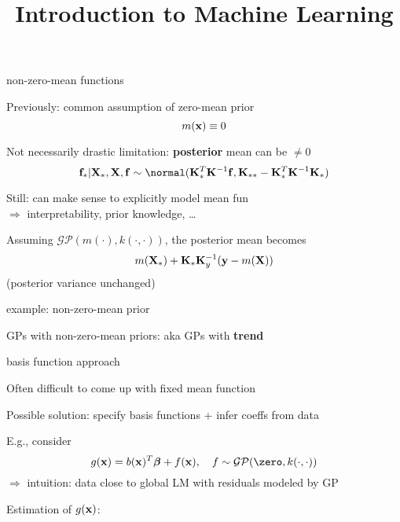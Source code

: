 \documentclass[11pt,compress,t,notes=noshow, xcolor=table]{beamer}
\title{Introduction to Machine Learning}
\begin{document}
\newcommand{\nmk}{\normal(\zero, \Kmat)} %
\newcommand{\nzk}{\normal(\zero, \Kmat)}
\newcommand{\xxtnorm}{\| \xv - \xtil \|}
\newcommand{\kcc}{k(\cdot, \cdot)} 
\newcommand{\kxxt}{k(\xv, \xtil)} %
\newcommand{\Xsubset}{\bm{X}}
\newcommand{\fX}{f(\Xsubset)}
\newcommand{\kXX}{k(\Xsubset, \Xsubset)}
\newcommand{\mX}{m(\Xsubset)}
\newcommand{\gpmk}{\mathcal{GP}(m(\cdot), k(\cdot, \cdot))}
\newcommand{\gpzk}{\mathcal{GP}(\zero, k(\cdot, \cdot))}
\newcommand{\Kmatinv}{\Kmat^{-1}}
\newcommand{\xstar}{\xv_\ast}
\newcommand{\ystar}{\yv_\ast}
\newcommand{\fstar}{\fv_\ast}
\newcommand{\Xstar}{\Xmat_\ast}
\newcommand{\Ky}{\Kmat_y}



\begin{framei}[sep=L]{non-zero-mean functions}
\item Previously: common assumption of zero-mean prior $$m(\mathbf{x}) \equiv 0$$
\item Not necessarily drastic limitation: \textbf{posterior} mean can be $\neq 0$
$$\fstar | \Xstar, \Xmat, \fv \sim \normal(\Kstar^{T}\Kmat^{-1}\fv, \Kstarstar - \Kstar^T \Kmat ^{-1}\Kstar)$$
\item Still: can make sense to explicitly model mean fun \\$\Rightarrow$ interpretability, prior knowledge, \dots
\item Assuming $\gpmk$, the posterior mean becomes
$$m(\Xstar) + \Kstar \Ky^{-1} (\yv - m(\Xmat))$$
(posterior variance unchanged)
\end{framei}

\begin{framei}[sep=L]{example: non-zero-mean prior}
\item GPs with non-zero-mean priors: aka GPs with \textbf{trend}
\vfill
{}
\vfill
{}
\end{framei}

\begin{framei}[sep=L]{basis function approach}
\item Often difficult to come up with fixed mean function
\item Possible solution: specify basis functions + infer coeffs from data
\item E.g., consider $$g(\xv) = b(\xv)^T\bm{\beta} + \fx, \quad f  \sim \gpzk$$
$\Rightarrow$ intuition: data close to global LM with residuals modeled by GP
\item Estimation of $g(\mathbf{x})$: 
\end{framei}

\endlecture
\end{document}

